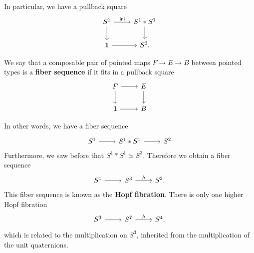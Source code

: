 \documentclass[handout]{beamer}
\newcommand{\unit}{\mathbf{1}}
\newcommand{\sphere}[1]{S^{#1}}
\newcommand{\inl}{\mathsf{inl}}
\begin{document}
\begin{frame}
  In particular, we have a pullback square
  \begin{equation*}
    \begin{tikzcd}[ampersand replacement=\&]
      \sphere{1} \arrow[r,"\inl"] \arrow[d] \& \sphere{1}\ast\sphere{1} \arrow[d] \\
      \unit \arrow[r] \& \sphere{2}.
    \end{tikzcd}
  \end{equation*}

  \begin{definition}
    We say that a composable pair of pointed maps $F\to E\to B$ between pointed types is a \textbf{fiber sequence} if it fits in a pullback square
    \begin{equation*}
      \begin{tikzcd}[ampersand replacement=\&]
        F \arrow[d] \arrow[r] \& E \arrow[d] \\
        \unit \arrow[r] \& B
      \end{tikzcd}
    \end{equation*}
  \end{definition}
\end{frame}

\begin{frame}
  In other words, we have a fiber sequence
  \begin{equation*}
    \begin{tikzcd}[ampersand replacement=\&]
      \sphere{1} \arrow[r] \& \sphere{1}\ast\sphere{1} \arrow[r] \& \sphere{2}
    \end{tikzcd}
  \end{equation*}
  Furthermore, we saw before that $\sphere{1}\ast\sphere{1}\simeq\sphere{3}$. Therefore we obtain a fiber sequence
  \begin{equation*}
    \begin{tikzcd}[ampersand replacement=\&]
      \sphere{1} \arrow[r] \& \sphere{3} \arrow[r,"h"] \& \sphere{2}.
    \end{tikzcd}
  \end{equation*}
  This fiber sequence is known as the \textbf{Hopf fibration}. There is only one higher Hopf fibration
  \begin{equation*}
    \begin{tikzcd}[ampersand replacement=\&]
      \sphere{3} \arrow[r] \& \sphere{7} \arrow[r,"h"] \& \sphere{4},
    \end{tikzcd}
  \end{equation*}
  which is related to the multiplication on $\sphere{3}$, inherited from the multiplication of the unit quaternions.
\end{frame}
\end{document}
